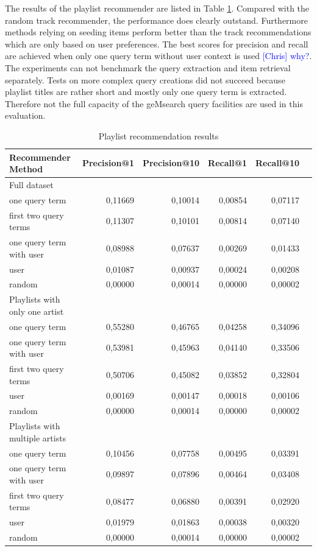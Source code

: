 \documentclass[sigconf]{acmart}
\newcommand{\ce}[1]{\textcolor{blue}{[Chris] #1}}
\newcommand{\ce}[1]{}
\begin{document}
The results of the playlist recommender are listed in Table \ref{table:playlist_rec_results}. Compared with the random track recommender, the performance does clearly outstand. Furthermore methods relying on seeding items perform better than the track recommendations which are only based on user preferences. The best scores for precision and recall are achieved when only one query term without user context is used \ce{why?}. The experiments can not benchmark the query extraction and item retrieval separately. Tests on more complex query creations did not succeed because playlist titles are rather short and mostly only one query term is extracted. Therefore not the full capacity of the geMsearch query facilities are used in this evaluation.  \\


\begin{table}
	\caption{Playlist recommendation results}
	\label{table:playlist_rec_results}
	\begin{tabular}{lrrrrr}
		\midrule 
		\textbf{Recommender Method}& \textbf{Precision@1} & \textbf{Precision@10} & \textbf{Recall@1} & \textbf{Recall@10} \\ 
		
		\midrule 
		Full dataset \\
		\cmidrule{1-1}
		one query term  & 0,11669 & 0,10014 & 0,00854 & 0,07117 \\
		first two query terms & 0,11307 & 0,10101 & 0,00814 & 0,07140 \\
		one query term with user & 0,08988 & 0,07637 & 0,00269 & 0,01433  \\
		user & 0,01087 & 0,00937 & 0,00024 & 0,00208 \\
		random & 0,00000 & 0,00014 & 0,00000 & 0,00002 \\
		
		\midrule 
		Playlists with only one artist \\
		\cmidrule{1-1}
		one query term  & 0,55280 & 0,46765 & 0,04258 &	0,34096 \\
		one query term with user& 0,53981 & 0,45963 & 0,04140 & 0,33506 \\
		first two query terms & 0,50706 & 0,45082 & 0,03852 & 0,32804 \\
		user & 0,00169 & 0,00147 & 0,00018 & 0,00106 \\
		random & 0,00000 & 0,00014 & 0,00000 & 0,00002 \\ %
		
		\midrule 
		Playlists with multiple artists \\
		\cmidrule{1-1}
		one query term  & 0,10456 & 0,07758 & 0,00495 & 0,03391 \\
		one query term with user& 0,09897 & 0,07896 & 0,00464 & 0,03408 \\
		first two query terms & 0,08477 & 0,06880 & 0,00391 & 0,02920 \\
		user & 0,01979 &	0,01863 & 0,00038 & 0,00320 \\
		random & 0,00000 & 0,00014 & 0,00000 & 0,00002 \\ %
		
		\bottomrule
	\end{tabular}
\end{table}
\end{document}
